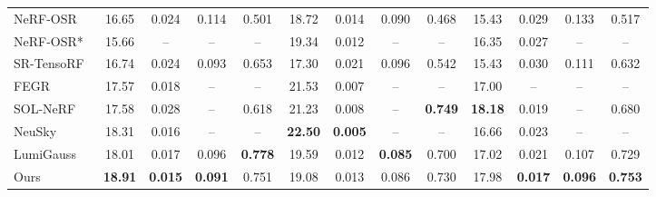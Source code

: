 \documentclass[conference]{IEEEtran}
\begin{document}
\begin{table}[!tb]
\begin{tabular}{l cccc cccc cccc}
        NeRF-OSR~\cite{rudnev2022nerfOSR}             & 16.65                             & 0.024                             & 0.114                             & 0.501            & 18.72 & 0.014 & 0.090 & 0.468 & 15.43 & 0.029 & 0.133 & 0.517 \\
        NeRF-OSR*~\cite{rudnev2022nerfOSR}            & 15.66                             & --                                & --                                & --               & 19.34 & 0.012 & --    & --    & 16.35 & 0.027 & --    & --    \\
        SR-TensoRF~\cite{jin2023tensoir}              & 16.74                             & 0.024                             & 0.093                             & 0.653            & 17.30 & 0.021 & 0.096 & 0.542 & 15.43 & 0.030 & 0.111 & 0.632 \\
        FEGR~\cite{fegr2024}                          & 17.57                             & 0.018                             & --                                & --               & 21.53 & 0.007 & --    & --    & 17.00 & --    & --    & --    \\
        SOL-NeRF~\cite{solnerf2024}                   & 17.58                             & 0.028                             & --                                & 0.618            & 21.23 & 0.008 & --    & \textbf{0.749} & \textbf{18.18} & 0.019 & --    & 0.680 \\
        NeuSky~\cite{neusky2024}                      & 18.31                             & 0.016                             & --                                & --               & \textbf{22.50} & \textbf{0.005} & --    & --    & 16.66 & 0.023 & --    & --    \\
        LumiGauss~\cite{joaxkal2024lumigauss}         & 18.01                             & 0.017                             & 0.096                             & \textbf{0.778}  & 19.59 & 0.012 & \textbf{0.085} & 0.700 & 17.02 & 0.021 & 0.107 & 0.729 \\
        Ours                                          & \textbf{18.91}                   & \textbf{0.015}                   & \textbf{0.091}                   & 0.751            & 19.08 & 0.013 & 0.086 & 0.730 & 17.98 & \textbf{0.017} & \textbf{0.096} & \textbf{0.753} \\

\end{tabular}
\end{table}
\end{document}
